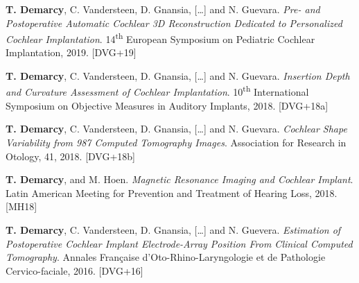 \begin{cvhonors}

  \cvhonor
    {\textbf{T. Demarcy}, C. Vandersteen, D. Gnansia, [\ldots] and N. Guevara. \textit{Pre- and Postoperative Automatic Cochlear 3D Reconstruction Dedicated to Personalized Cochlear Implantation}. 14\textsuperscript{th} European Symposium on Pediatric Cochlear Implantation, 2019.} %
    {\hypertarget{DVG+19}{[DVG+19]}} %

  \cvhonor
    {\textbf{T. Demarcy}, C. Vandersteen, D. Gnansia, [\ldots] and N. Guevara. \textit{Insertion Depth and Curvature Assessment of Cochlear Implantation}. 10\textsuperscript{th} International Symposium on Objective Measures in Auditory Implants, 2018.} %
    {\hypertarget{DVG+18a}{[DVG+18a]}} %
    
  \cvhonor
    {\textbf{T. Demarcy}, C. Vandersteen, D. Gnansia, [\ldots] and N. Guevara. \textit{Cochlear Shape Variability from 987 Computed Tomography Images}. Association for Research in Otology, 41, 2018.} %
    {\hypertarget{DVG+18b}{[DVG+18b]}} %
    
  \cvhonor
    {\textbf{T. Demarcy}, and M. Hoen. \textit{Magnetic Resonance Imaging and Cochlear Implant}. Latin American Meeting for Prevention and Treatment of Hearing Loss, 2018.} %
    {\hypertarget{MH18}{[MH18]}} %

  \cvhonor
    {\textbf{T. Demarcy}, C. Vandersteen, D. Gnansia, [\ldots] and N. Guevera. \textit{Estimation of Postoperative Cochlear Implant Electrode-Array Position From Clinical Computed Tomography}. Annales Française d’Oto-Rhino-Laryngologie et de Pathologie Cervico-faciale, 2016.} %
    {\hypertarget{DVG+16}{[DVG+16]}} %

\end{cvhonors}




